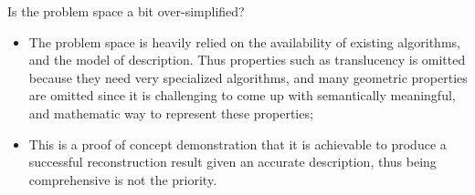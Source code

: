 \documentclass[10pt]{beamer}
\begin{document}
\begin{frame}

\begin{alertblock}{Is the problem space a bit over-simplified?}
\begin{itemize}
\item The problem space is heavily relied on the availability of existing algorithms, and the model of description. Thus properties such as translucency is omitted because they need very specialized algorithms, and many geometric properties are omitted since it is challenging to come up with semantically meaningful, and mathematic way to represent these properties;
\item This is a proof of concept demonstration that it is achievable to produce a successful reconstruction result given an accurate description, thus being comprehensive is not the priority.
\end{itemize}
\end{alertblock}

\end{frame}
\end{document}

